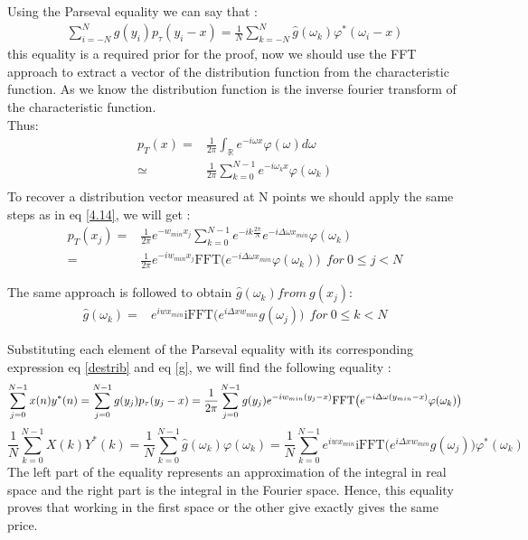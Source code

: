 \documentclass[12pt]{report}
\begin{document}
Using the Parseval equality we can say that :
\begin{align}
\sum_{i=-N}^{N}g(y_i)p_{\tau}(y_i-x)=\frac{1}{N}\sum_{k=-N}^{N}\hat {g}(\omega_k)\varphi^*(\omega_i-x)
\end{align}
this equality is a required prior for the proof, now we should use the FFT approach to extract a vector of the distribution function from the characteristic function.
As we know the distribution function is the inverse fourier transform of the characteristic function.\\ Thus:
\begin{align*}
p_T(x)=&\frac{1}{2 \pi}\int_{\mathbb{R}}e^{-i \omega x } \varphi(\omega) d\omega\\
\simeq &\frac{1}{2 \pi}\sum_{k=0}^{N-1}e^{-i \omega_k x } \varphi(\omega_k) \\
\end{align*}
To recover a distribution vector measured at N points we should  apply the same steps as in eq \eqref{4.14}, we will get :
\begin{align}
p_T(x_j)=&\frac{1}{2 \pi} e^{- w_{min} x_j}\sum_{k=0}^{N-1} e^{- i k \frac{2 \pi}{N}} e^{-i \Delta\omega x_{min} } \varphi(\omega_k) \nonumber \\
=&\frac{1}{2 \pi} e^{- iw_{min} x_j} \text{FFT}\big ( e^{-i \Delta\omega x_{min} } \varphi(\omega_k) \big) ~~for~ 0 \leqslant j < N
\label{destrib}
\end{align}

The same approach is followed to obtain ${\hat g (\omega_k) } from ~g(x_j)$:
\begin{align}
\label{g}
\hat g (\omega_k)=& e^{i w x_{min}} \text{iFFT}\big ( e^{i \Delta x w_{min} } g(\omega_j) \big) ~~for~ 0 \leqslant k < N
\end{align}

Substituting each element of the Parseval equality with its corresponding expression eq \eqref{destrib} and eq \eqref{g}, we will find the following equality :
\begin{equation}
\label{sum}
\sum \limits_{j=0}^{N-1} x(n)y^*(n)= \sum \limits_{j=0}^{N-1} g(y_j) p_{\tau}(y_j-x)\\
=\frac{1}{2 \pi}\sum \limits_{j=0}^{N-1} g(y_j)e^{- iw_{min} (y_j-x)} \text{FFT} \big ( e^{-i \Delta\omega (y_{min}-x) } \varphi(\omega_k) \big)
\end{equation}
\begin{equation}
\label{rm2}
\frac{1}{N} \sum \limits_{k=0}^{N-1} X(k)Y^*(k)=\frac{1}{N}\sum \limits_{k=0}^{N-1} \hat{g}(\omega_k) \varphi(\omega_k)=\frac{1}{N}\sum \limits_{k=0}^{N-1}e^{i w x_{min}} \text{iFFT}\big ( e^{i \Delta x w_{min} } g(\omega_j) \big) \varphi^*(\omega_k)
\end{equation}
The left part of the equality represents an approximation of the integral in real space and the  right part is the integral in the Fourier space. Hence, this equality proves that working in the first space or the other give exactly gives the same price.\\
\end{document}
